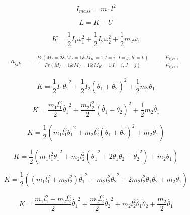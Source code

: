 \documentclass[fleqn]{article}
\begin{document}
\begin{equation}
    I_{mass} = m \cdot l^2
\end{equation}

\begin{equation}
L=K-U
\end{equation}

\begin{equation}
K = \frac{1}{2}I_1\omega_1^2 + \frac{1}{2}I_2\omega_2^2+\frac{1}{2}m_2\omega_1
\end{equation}

\begin{equation}
\begin{aligned}
a_{ijk} &= \frac {Pr(M_{I} =2  \&  M_J=1 \& M_K =1 | I=i , J=j , K=k)}{Pr (M_I =1 \& M_J =1 \& M_K=1 | I=i , J=j)}\
        &= \frac {\mu_{ijk211}}{\mu_{ijk111}}\
\end{aligned}
\end{equation}

\begin{equation}
K = \frac{1}{2}I_1\dot{\theta_1}^2 + \frac{1}{2}I_2(\dot{\theta_1}+\dot{\theta_2})^2+\frac{1}{2}m_2\dot{\theta_1}
\end{equation}

\begin{equation}
K = \frac{m_1l_1^2}{2}\dot{\theta_1}^2 + \frac{m_2l_2^2}{2}(\dot{\theta_1}+\dot{\theta_2})^2+\frac{1}{2}m_2\dot{\theta_1}
\end{equation}

\begin{equation}
K = \frac{1}{2}(m_1l_1^2\dot{\theta_1}^2 + m_2l_2^2(\dot{\theta_1}+\dot{\theta_2})^2+m_2\dot{\theta_1})
\end{equation}

\begin{equation}
K = \frac{1}{2}(m_1l_1^2\dot{\theta_1}^2 + m_2l_2^2(\dot{\theta_1}^2+2\dot{\theta_1}\dot{\theta_2}+\dot{\theta_2}^2)+m_2\dot{\theta_1})
\end{equation}

\begin{equation}
K = \frac{1}{2}((m_1l_1^2+m_2l_2^2)\dot{\theta_1}^2 + m_2l_2^2\dot{\theta_2}^2+2m_2l_2^2\dot{\theta_1}\dot{\theta_2}+m_2\dot{\theta_1})
\end{equation}

\begin{equation}
K = \frac{m_1l_1^2+m_2l_2^2}{2}\dot{\theta_1}^2 + \frac{m_2l_2^2}{2}\dot{\theta_2}^2+m_2l_2^2\dot{\theta_1}\dot{\theta_2}+\frac{m_2}{2}\dot{\theta_1}
\end{equation}
\end{document}
